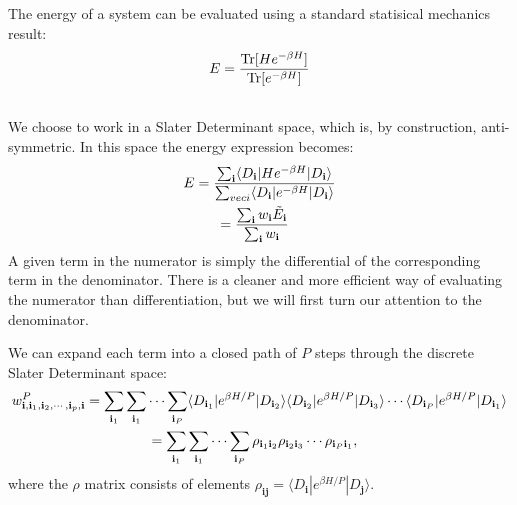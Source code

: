 \documentclass[openany,a4paper,10pt,english]{manual}
\newcommand{\bra}{\ensuremath{\langle}}
\newcommand{\ket}{\ensuremath{\rangle}}
\newcommand{\veci}{\ensuremath{\mathbf{i}}}
\newcommand{\vecj}{\ensuremath{\mathbf{j}}}
\begin{document}
The energy of a system can be evaluated using a standard statisical mechanics result:
\begin{gather}
\begin{split}E = \frac{\operatorname{Tr}[H e^{-\beta H}]}{\operatorname{Tr}[e^{-\beta H}]}\end{split}\notag\\\begin{split}\end{split}\notag
\end{gather}
We choose to work in a Slater Determinant space, which is, by construction, anti-symmetric.  In this space the energy expression becomes:
\begin{gather}
\begin{split}E &= \frac{\sum_{\veci} \bra D_{\veci} | H e^{-\beta H} | D_{\veci} \ket}{\sum_{veci} \bra D_{\veci} | e^{-\beta H} | D_{\veci} \ket} \\\end{split}\notag\\\begin{split}  &= \frac{\sum_{\veci} w_{\veci} \tilde{E}_{\veci}}{\sum_{\veci} w_{\veci}}\end{split}\notag
\end{gather}
A given term in the numerator is simply the differential of the
corresponding term in the denominator.  There is a cleaner and more
efficient way of evaluating the numerator than differentiation, but we
will first turn our attention to the denominator.

We can expand each term into a closed path of $P$ steps through the discrete Slater Determinant space:
\begin{gather}
\begin{split}w^P_{\veci,\veci_1,\veci_2,\cdots,\veci_p,\veci} &= \sum_{\veci_1} \sum_{\veci_1} \cdots \sum_{\veci_P} \bra D_{\veci_1} | e^{\beta H/P} | D_{\veci_2}  \ket \bra D_{\veci_2} | e^{\beta H/P} | D_{\veci_3}  \ket \cdots \bra D_{\veci_P} | e^{\beta H/P} | D_{\veci_1}  \ket \\\end{split}\notag\\\begin{split}& =  \sum_{\veci_1} \sum_{\veci_1} \cdots \sum_{\veci_P} \rho_{\veci_1\veci_2} \rho_{\veci_2\veci_3} \cdots \rho_{\veci_P\veci_1},\end{split}\notag
\end{gather}
where the $\rho$ matrix consists of elements
$\rho_{\veci\vecj}=\bra D_{\veci} | e^{\beta H/P} | D_{\vecj} \ket$.
\end{document}
